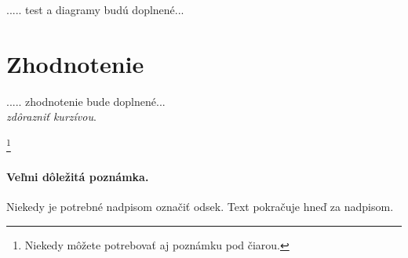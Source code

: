 \documentclass[10pt,twoside,slovak,a4paper]{article}
\begin{document}
..... test a diagramy budú doplnené... \\




\section{Zhodnotenie} \label{6sek} %
..... zhodnotenie bude doplnené... \\

\emph{zdôrazniť kurzívou}.

\footnote{Niekedy môžete potrebovať aj poznámku pod čiarou.}

\paragraph{Veľmi dôležitá poznámka.}
Niekedy je potrebné nadpisom označiť odsek. Text pokračuje hneď za nadpisom.






\end{document}
